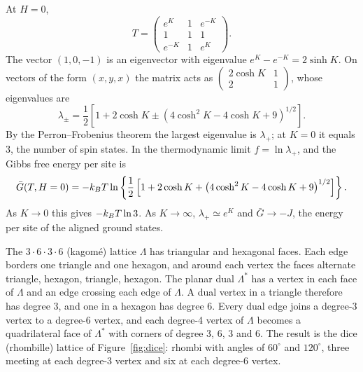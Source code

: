  At $H = 0$,
\begin{equation}
  T = \begin{pmatrix} e^{K} & 1 & e^{-K}\\ 1 & 1 & 1\\ e^{-K} & 1 & e^{K}\end{pmatrix}.
\end{equation}
The vector $(1,0,-1)$ is an eigenvector with eigenvalue $e^K-e^{-K} = 2\sinh K$. On vectors of the form $(x,y,x)$ the
matrix acts as $\left(\begin{smallmatrix}2\cosh K & 1\\ 2 & 1\end{smallmatrix}\right)$, whose eigenvalues are
\begin{equation}
  \lambda_\pm = \frac{1}{2}\left[1+2\cosh K\pm\left(4\cosh^2K-4\cosh K+9\right)^{1/2}\right].
\end{equation}
By the Perron--Frobenius theorem the largest eigenvalue is $\lambda_+$; at $K = 0$ it equals 3, the number of spin
states. In the thermodynamic limit $f = \ln\lambda_+$, and the Gibbs free energy per site is
\begin{equation}
  \bar G(T,H=0) = -k_{B} T\ln\left\{\frac{1}{2}\left[1+2\cosh K+\left(4\cosh^2K-4\cosh K+9\right)^{1/2}\right]\right\}.
\end{equation}
As $K\to 0$ this gives $-k_{B} T\ln 3$. As $K\to\infty$, $\lambda_+\simeq e^K$ and $\bar G\to-J$, the energy per site of
the aligned ground states.

The $3\cdot 6\cdot 3\cdot 6$ (kagom\'e) lattice $\Lambda$ has triangular and hexagonal faces. Each edge borders one
triangle and one hexagon, and around each vertex the faces alternate triangle, hexagon, triangle, hexagon. The planar
dual $\Lambda^*$ has a vertex in each face of $\Lambda$ and an edge crossing each edge of $\Lambda$. A dual vertex in a
triangle therefore has degree 3, and one in a hexagon has degree 6. Every dual edge joins a degree-3 vertex to a
degree-6 vertex, and each degree-4 vertex of $\Lambda$ becomes a quadrilateral face of $\Lambda^*$ with corners of
degree 3, 6, 3 and 6. The result is the dice (rhombille) lattice of Figure~\ref{fig:dice}: rhombi with angles of
$60^\circ$ and $120^\circ$, three meeting at each degree-3 vertex and six at each degree-6 vertex.

